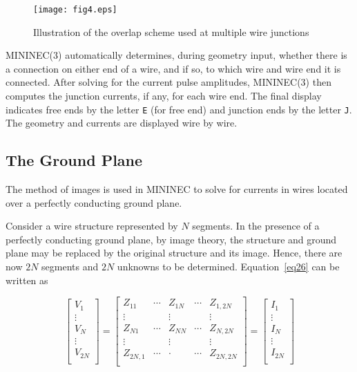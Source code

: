\documentclass[12pt]{article}
\begin{document}
\begin{figure}[htb]
\centerline{\texttt{[image: fig4.eps]}}
\caption{Illustration of the overlap scheme used at multiple wire junctions}
\label{fig4}
\end{figure}

MININEC(3) automatically determines, during geometry input, whether
there is a connection on either end of a wire, and if so, to which wire
and wire end it is connected. After solving for the current pulse
amplitudes, MININEC(3) then computes the junction currents, if any, for
each wire end. The final display indicates free ends by the letter
\verb+E+ (for free end) and junction ends by the letter \verb+J+. The
geometry and currents are displayed wire by wire.

\subsection{The Ground Plane}
\label{sec-groundplane}

The method of images is used in MININEC to solve for currents in wires
located over a perfectly conducting ground plane.

Consider a wire structure represented by $N$ segments. In the presence
of a perfectly conducting ground plane, by image theory, the structure
and ground plane may be replaced by the original structure and its
image. Hence, there are now $2N$ segments and $2N$ unknowns to be
determined. Equation~\eqref{eq26} can be written as

\begin{equation}
\left[
\begin{array}{l}
V_1    \\
\vdots \\
V_N    \\
\vdots \\
V_{2N} \\
\end{array}
\right]
=
\left[
\begin{array}{lllll}
Z_{11}   & \cdots & Z_{1N} & \cdots & Z_{1,2N}  \\
\vdots   &        &\vdots  &        & \vdots    \\
Z_{N1}   & \cdots & Z_{NN} & \cdots & Z_{N,2N}  \\
\vdots   &        &\vdots  &        & \vdots    \\
Z_{2N,1} & \cdots &\cdot   & \cdots & Z_{2N,2N} \\
\end{array}
\right]
=
\left[
\begin{array}{l}
I_1    \\
\vdots \\
I_N    \\
\vdots \\
I_{2N}    \\
\end{array}
\right]
\label{eq29}
\end{equation}
\end{document}
